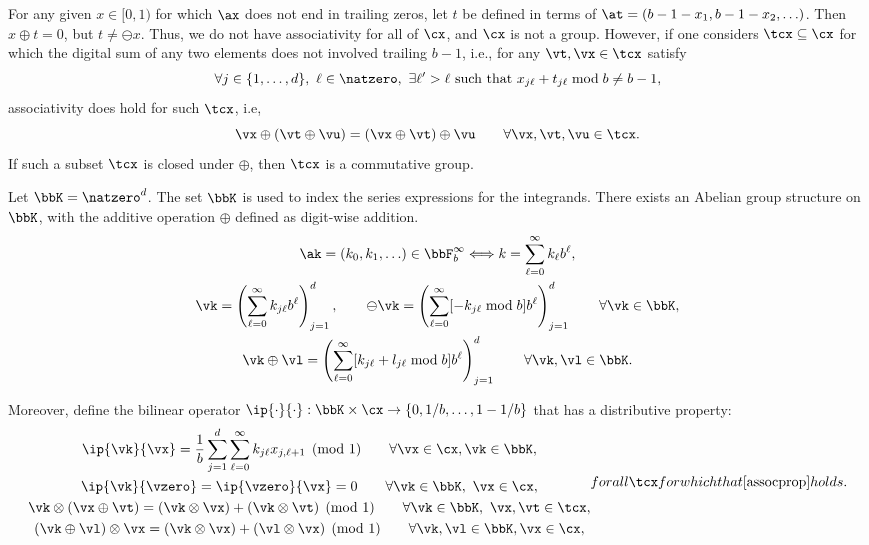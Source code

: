 \documentclass[]{elsarticle}
\theoremstyle{definition}
\begin{document}
For any given $x \in [0,1)$ for which $\ax$ does not end in trailing zeros, let $t$ be defined in terms of $\at=(b-1-x_1, b-1-x_2, \ldots)$.  Then $x \oplus t = 0$, but $t \ne \ominus x$.  Thus, we do not have associativity for all of $\cx$, and $\cx$ is not a group.  However, if one considers $\tcx \subseteq \cx$ for which the digital sum of any two elements does not involved trailing $b-1$, i.e., for any $\vt, \vx \in \tcx$ satisfy 
\[
\forall j \in \{1, \ldots, d\},\ \ell \in \natzero,\  \exists \ell'>\ell \text{ such that } x_{j\ell} + t_{j\ell} \bmod b \ne b-1,
\]
associativity does hold for such $\tcx$, i.e, 
\begin{equation} \label{assocprop}
\vx \oplus (\vt \oplus \vu) = (\vx \oplus \vt) \oplus \vu \qquad \forall \vx,\vt,\vu \in \tcx.
\end{equation}
If such a subset $\tcx$ is closed under $\oplus$, then $\tcx$ is a commutative group.

Let $\bbK=\natzero^d$.  The set $\bbK$ is used to index the series expressions for the integrands.  There exists an Abelian group structure on $\bbK$, with the additive operation $\oplus$ defined as digit-wise addition.  
\begin{gather*}
\ak=(k_0, k_1, \ldots ) \in \bbF_b^\infty \Longleftrightarrow k=\sum_{\ell=0}^\infty k_\ell b^{\ell},\\
\vk =  \left(\sum_{\ell=0}^{\infty} k_{j\ell} b^{\ell}\right)_{j=1}^d, \qquad \ominus \vk = \left(\sum_{\ell=0}^{\infty} [-k_{j\ell} \bmod b] b^{\ell}\right)_{j=1}^d \qquad \forall \vk \in \bbK, \\
\vk \oplus \vl = \left(\sum_{\ell=0}^{\infty} [k_{j\ell} + l_{j\ell} \bmod b] b^{\ell}\right)_{j=1}^d \qquad \forall \vk, \vl \in \bbK.
\end{gather*}

Moreover, define the bilinear operator $\ip{\cdot}{\cdot}: \bbK \times \cx \to \{0, 1/b, \ldots, 1-1/b\}$ that has a distributive property:
\begin{subequations} \label{distrib}
\begin{gather}
\ip{\vk}{\vx} = \frac 1b \sum_{j=1}^{d} \sum_{\ell=0}^{\infty} k_{j\ell}x_{j,\ell+1}  \pmod 1 \qquad \forall \vx \in \cx, \vk \in \bbK, \\
\ip{\vk}{\vzero} = \ip{\vzero}{\vx} = 0 \qquad \forall \vk \in \bbK, \ \vx \in \cx,\\
\vk \otimes (\vx \oplus \vt) = (\vk\otimes\vx) + (\vk\otimes\vt) \pmod 1 \qquad \forall \vk \in \bbK, \ \vx, \vt \in \tcx, \\
(\vk \oplus \vl) \otimes \vx = (\vk\otimes\vx) + (\vl\otimes\vx) \pmod 1 \qquad \forall \vk,\vl \in \bbK, \vx \in \cx,
\end{gather}
for all $\tcx$ for which that \eqref{assocprop} holds.
\end{subequations}
\end{document}
